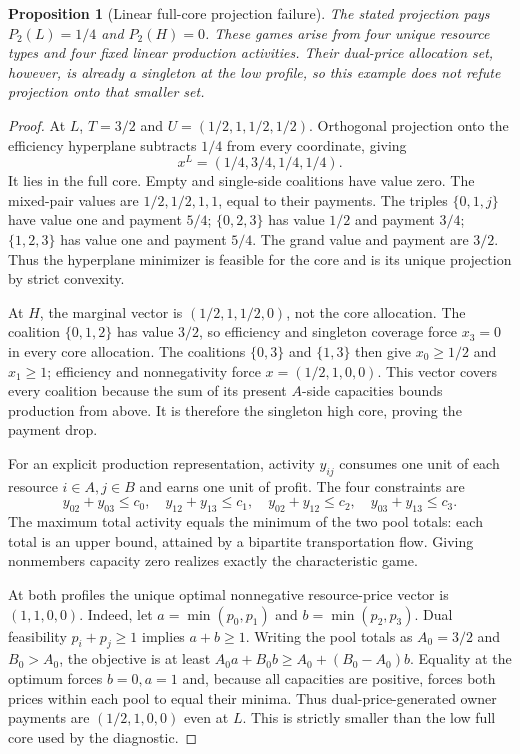 \documentclass[11pt]{article}
\newtheorem{proposition}[theorem]{Proposition}
\theoremstyle{definition}\newtheorem{definition}[theorem]{Definition}
\theoremstyle{remark}\newtheorem{remark}[theorem]{Remark}
\begin{document}
\begin{proposition}[Linear full-core projection failure]
\label{net:linear-projection}
The stated projection pays $P_2(L)=1/4$ and $P_2(H)=0$.
These games arise from four unique resource types and four fixed linear
production activities.  Their dual-price allocation set, however, is already
a singleton at the low profile, so this example does not refute projection
onto that smaller set.
\end{proposition}
\begin{proof}
At $L$, $T=3/2$ and $U=(1/2,1,1/2,1/2)$.
Orthogonal projection onto the efficiency hyperplane subtracts $1/4$ from
every coordinate, giving
\[
 x^L=(1/4,3/4,1/4,1/4).
\]
It lies in the full core.  Empty and single-side coalitions have value zero.
The mixed-pair values are $1/2,1/2,1,1$, equal to their payments.
The triples $\{0,1,j\}$ have value one and payment $5/4$;
$\{0,2,3\}$ has value $1/2$ and payment $3/4$;
$\{1,2,3\}$ has value one and payment $5/4$.
The grand value and payment are $3/2$.
Thus the hyperplane minimizer is feasible for the core and is its unique
projection by strict convexity.

At $H$, the marginal vector is $(1/2,1,1/2,0)$, not the core allocation.
The coalition $\{0,1,2\}$ has value $3/2$, so efficiency and singleton
coverage force $x_3=0$ in every core allocation.  The coalitions
$\{0,3\}$ and $\{1,3\}$ then give $x_0\ge1/2$ and $x_1\ge1$;
efficiency and nonnegativity force $x=(1/2,1,0,0)$.
This vector covers every coalition because the sum of its present $A$-side
capacities bounds production from above.  It is therefore the singleton high
core, proving the payment drop.

For an explicit production representation, activity $y_{ij}$ consumes one
unit of each resource $i\in A,j\in B$ and earns one unit of profit.
The four constraints are
\[
 y_{02}+y_{03}\le c_0,\quad y_{12}+y_{13}\le c_1,\quad
 y_{02}+y_{12}\le c_2,\quad y_{03}+y_{13}\le c_3.
\]
The maximum total activity equals the minimum of the two pool totals:
each total is an upper bound, attained by a bipartite transportation flow.
Giving nonmembers capacity zero realizes exactly the characteristic game.

At both profiles the unique optimal nonnegative resource-price vector is
$(1,1,0,0)$.  Indeed, let $a=\min(p_0,p_1)$ and $b=\min(p_2,p_3)$.
Dual feasibility $p_i+p_j\ge1$ implies $a+b\ge1$.
Writing the pool totals as $A_0=3/2$ and $B_0>A_0$, the objective is at least
$A_0a+B_0b\ge A_0+(B_0-A_0)b$.
Equality at the optimum forces $b=0,a=1$ and, because all capacities are
positive, forces both prices within each pool to equal their minima.
Thus dual-price-generated owner payments are $(1/2,1,0,0)$ even at $L$.
This is strictly smaller than the low full core used by the diagnostic.
\end{proof}
\end{document}
